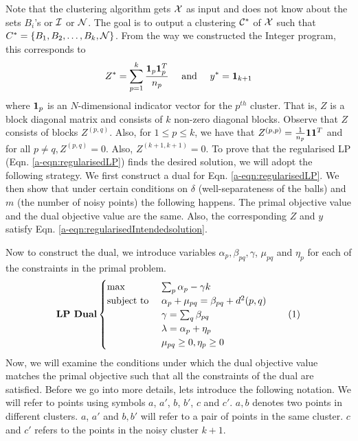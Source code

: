 Note that the clustering algorithm gets $\mathcal X$ as input and does not know about the sets $B_i$'s or $\mathcal I$ or $\mathcal N$. The goal is to output a clustering $\mathcal C^*$ of $\mathcal X$ such that $C^* = \{B_1, B_2, \ldots, B_k, \mathcal N\}$. From the way we constructed the Integer program, this corresponds to
\begin{align}
  Z^* = \sum_{p=1}^k \frac{\mathbf 1_p \mathbf 1_{p}^T}{n_p} \enspace\enspace\text{ and }\enspace\enspace y^* = \mathbf 1_{k+1}\label{a-eqn:regularisedIntendedsolution}
\end{align}
where $\mathbf 1_p$ is an $N$-dimensional indicator vector for the $p^{th}$ cluster. That is, $Z$ is a block diagonal matrix and consists of $k$ non-zero diagonal blocks. Observe that $Z$ consists of blocks $Z^{(p, q)}$. Also, for $1\le p \le k$, we have that $Z^{(p, p)} = \frac{1}{n_p}\mathbf 1\mathbf 1^T$ and for all $p \neq q, Z^{(p, q)} = 0$. Also, $Z^{(k+1, k+1)} = 0$. To prove that the regularised LP (Eqn. \ref{a-eqn:regularisedLP}) finds the desired solution, we  will adopt the following strategy. We first construct a dual for Eqn. \ref{a-eqn:regularisedLP}. We then show that under certain conditions on $\delta$ (well-separateness of the balls) and $m$ (the number of noisy points) the following happens. The primal objective value and the dual objective value are the same. Also, the corresponding $Z$ and $y$ satisfy Eqn. \ref{a-eqn:regularisedIntendedsolution}.

Now to construct the dual, we introduce variables $\alpha_p, \beta_{pq}, \gamma$, $\mu_{pq}$ and $\eta_p$ for each of the constraints in the primal problem. 
\[\textbf{LP Dual}
    \begin{cases}
		\max \enspace & \sum_{p} \alpha_{p} -\gamma k\\
		\text{subject to } 
		&\alpha_p + \mu_{pq} = \beta_{pq} + d^2(p, q)\\
		&\gamma = \sum_q \beta_{pq}\\
		&\lambda = \alpha_p + \eta_p \\
		&\mu_{pq} \ge 0, \eta_p \ge 0
	\end{cases}
	\label{a-eqn:resularisedLPDual}
	\numberthis
\]
Now, we will examine the conditions under which the dual objective value matches the primal objective such that all the constraints of the dual are satisfied. Before we go into more details, lets introduce the following notation. We will refer to points using symbols $a$, $a'$, $b$, $b'$, $c$ and $c'$. $a, b$ denotes two points in different clusters. $a$, $a'$ and $b, b'$ will refer to a pair of points in the same cluster. $c$ and $c'$ refers to the points in the noisy cluster $k+1$. 

